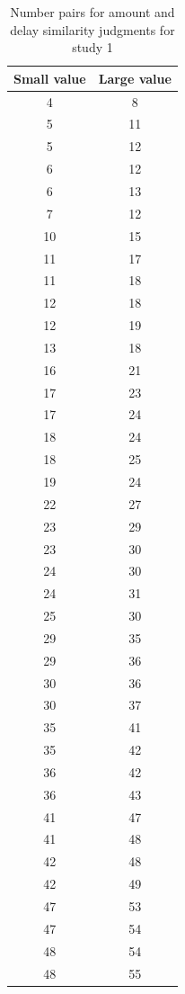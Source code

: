 \documentclass[
  doc,floatsintext]{apa6}
\begin{document}
\begin{table}[tbp]

\begin{center}
\begin{threeparttable}

\caption{\label{tab:unnamed-chunk-2}Number pairs for amount and delay similarity judgments for study 1}

\small{

\begin{tabular}{cc}
\toprule
Small value & \multicolumn{1}{c}{Large value}\\
\midrule
4 & 8\\
5 & 11\\
5 & 12\\
6 & 12\\
6 & 13\\
7 & 12\\
10 & 15\\
11 & 17\\
11 & 18\\
12 & 18\\
12 & 19\\
13 & 18\\
16 & 21\\
17 & 23\\
17 & 24\\
18 & 24\\
18 & 25\\
19 & 24\\
22 & 27\\
23 & 29\\
23 & 30\\
24 & 30\\
24 & 31\\
25 & 30\\
29 & 35\\
29 & 36\\
30 & 36\\
30 & 37\\
35 & 41\\
35 & 42\\
36 & 42\\
36 & 43\\
41 & 47\\
41 & 48\\
42 & 48\\
42 & 49\\
47 & 53\\
47 & 54\\
48 & 54\\
48 & 55\\
\bottomrule
\end{tabular}

}

\end{threeparttable}
\end{center}

\end{table}
\end{document}
